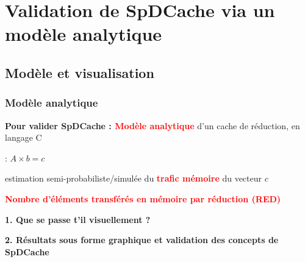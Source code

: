 
\section[Modèle analytique]{Validation de SpDCache via un modèle analytique}

\subsection{Modèle et visualisation}

\begin{frame}
    \frametitle{Modèle analytique}

    \textbf{Pour valider SpDCache : \textcolor{Red}{Modèle analytique}} d'un cache de réduction, en langage C

     : $A \times b = c$

    \bigskip





    \medskip

     estimation semi-probabiliste/simulée du \textbf{\textcolor{Red}{trafic mémoire}} du vecteur $c$
    

     \textbf{\textcolor{Red}{Nombre d'éléments transférés en mémoire par réduction (RED)}}

    \bigskip\bigskip

    \textbf{\textcolor{Mulberry}{1. Que se passe t'il visuellement ?}}

    \medskip

    \textbf{\textcolor{Mulberry}{2. Résultats sous forme graphique et validation des concepts de SpDCache}}

\end{frame}

